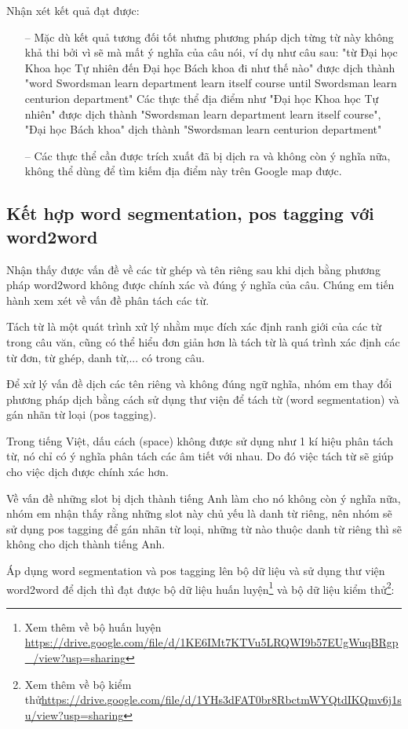 Nhận xét kết quả đạt được:
\begin{itemize}
    \item[--] Mặc dù kết quả tương đối tốt nhưng phương pháp dịch từng từ này không khả thi bởi vì sẽ mà mất ý nghĩa của câu nói, ví dụ như câu sau: "từ Đại học Khoa học Tự nhiên đến Đại học Bách khoa đi như thế nào" được dịch thành "word Swordsman learn department learn itself course until Swordsman learn centurion department" Các thực thể địa điểm như "Đại học Khoa học Tự nhiên" được dịch thành "Swordsman learn department learn itself course", "Đại học Bách khoa" dịch thành "Swordsman learn centurion department"
    \item[--] Các thực thể cần được trích xuất đã bị dịch ra và không còn ý nghĩa nữa, không thể dùng để tìm kiếm địa điểm này trên Google map được.
\end{itemize}
\subsection{Kết hợp word segmentation, pos tagging với word2word}

Nhận thấy được vấn đề về các từ ghép và tên riêng sau khi dịch bằng phương pháp word2word không được chính xác và đúng ý nghĩa của câu. Chúng em tiến hành xem xét về vấn đề phân tách các từ.

Tách từ là một quát trình xử lý nhằm mục đích xác định ranh giới của các từ trong câu văn, cũng có thể hiểu đơn giản hơn là tách từ là quá trình xác định các từ đơn, từ ghép, danh từ,... có trong câu.

Để xử lý vấn đề dịch các tên riêng và không đúng ngữ nghĩa, nhóm em thay đổi phương pháp dịch bằng cách sử dụng thư viện để tách từ (word segmentation) và gán nhãn từ loại (pos tagging).

Trong tiếng Việt, dấu cách (space) không được sử dụng như 1 kí hiệu phân tách từ, nó chỉ có ý nghĩa phân tách các âm tiết với nhau. Do đó việc tách từ sẽ giúp cho việc dịch được chính xác hơn.

Về vấn đề những slot bị dịch thành tiếng Anh làm cho nó không còn ý nghĩa nữa, nhóm em nhận thấy rằng những slot này chủ yếu là danh từ riêng, nên nhóm sẽ sử dụng pos tagging để gán nhãn từ loại, những từ nào thuộc danh từ riêng thì sẽ không cho dịch thành tiếng Anh.

Áp dụng word segmentation và pos tagging lên bộ dữ liệu và sử dụng thư viện word2word để dịch thì đạt được bộ dữ liệu huấn luyện\footnote{Xem thêm về bộ huấn luyện \url{https://drive.google.com/file/d/1KE6IMt7KTVu5LRQWI9b57EUgWuqBRgp_/view?usp=sharing}} và bộ dữ liệu kiểm thử\footnote{Xem thêm về bộ kiểm thử\url{https://drive.google.com/file/d/1YHs3dFAT0br8RbctmWYQtdIKQmv6j1su/view?usp=sharing}}:


